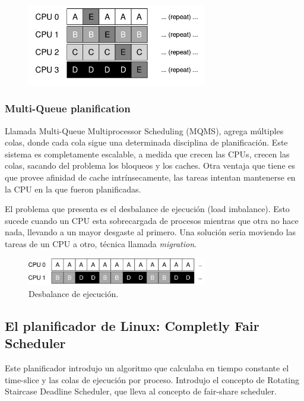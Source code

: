 \documentclass[titlepage,a4paper]{article}
\begin{document}
\begin{figure}[!htb]
    \centering
    \includegraphics[width=0.7\textwidth]{ImagenesApunte/afinidad2.jpg}
\end{figure}


\subsubsection*{Multi-Queue planification}

Llamada Multi-Queue Multiprocessor Scheduling (MQMS), agrega múltiples colas, donde cada cola sigue una determinada disciplina de planificación. Este sistema es completamente escalable, a medida que crecen las CPUs, crecen las colas, sacando del problema los bloqueos y los caches. Otra ventaja que tiene es que provee afinidad de cache intrínsecamente, las tareas intentan mantenerse en la CPU en la que fueron planificadas.

El problema que presenta es el desbalance de ejecución (load imbalance). Esto sucede cuando un CPU esta sobrecargada de procesos mientras que otra no hace nada, llevando a un mayor desgaste al primero. Una solución seria moviendo las tareas de un CPU a otro, técnica llamada \emph{migration}.

\begin{figure}[!htb]
    \centering
    \includegraphics[width=0.7\textwidth]{ImagenesApunte/load_imbalance.jpg}
    \caption{Desbalance de ejecución.}
\end{figure}

\subsection*{El planificador de Linux: Completly Fair Scheduler}
Este planificador introdujo un algoritmo que calculaba en tiempo constante el time-slice y las colas de ejecución por proceso. Introdujo el concepto de Rotating Staircase Deadline Scheduler, que lleva al concepto de fair-share scheduler.
\end{document}
